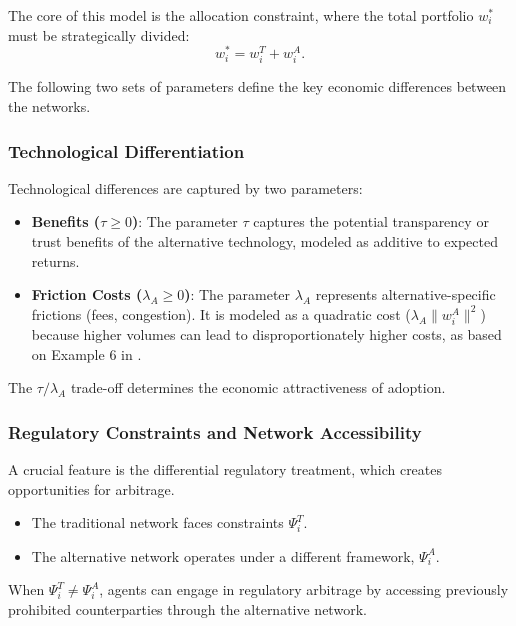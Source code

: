 The core of this model is the allocation constraint, where the total portfolio $w_i^*$ must be strategically divided:
\begin{equation}
w_i^* = w_i^T + w_i^A.
\label{eq:portfolio_constraint}
\end{equation}

The following two sets of parameters define the key economic differences between the networks.

\subsubsection{Technological Differentiation}

Technological differences are captured by two parameters:

\begin{itemize}
    \item \textbf{Benefits ($\tau \geq 0$)}: The parameter $\tau$ captures the potential transparency or trust benefits of the alternative technology, modeled as additive to expected returns.
    \item \textbf{Friction Costs ($\lambda_A \geq 0$)}: The parameter $\lambda_A$ represents alternative-specific frictions (fees, congestion). It is modeled as a quadratic cost ($\lambda_A\|w_i^A\|^2$) because higher volumes can lead to disproportionately higher costs, as based on Example 6 in .
\end{itemize}

The $\tau/\lambda_A$ trade-off determines the economic attractiveness of adoption.

\subsubsection{Regulatory Constraints and Network Accessibility}

A crucial feature is the differential regulatory treatment, which creates opportunities for arbitrage.

\begin{itemize}
    \item The traditional network faces constraints $\Psi_i^T$.
    \item The alternative network operates under a different framework, $\Psi_i^A$.
\end{itemize}

When $\Psi_i^T \neq \Psi_i^A$, agents can engage in regulatory arbitrage by accessing previously prohibited counterparties through the alternative network.

